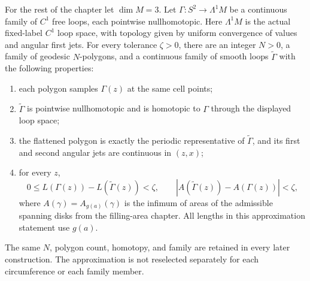 For the rest of the chapter let $\dim M=3$.
Let $\Gamma:S^2\to\Lambda^1M$ be a continuous family of $C^1$ free loops,
each pointwise nullhomotopic.  Here $\Lambda^1M$ is the actual fixed-label
$C^1$ loop space, with topology given by uniform convergence of values and
angular first jets.  For every tolerance $\zeta>0$, there are an integer
$N>0$, a family of geodesic $N$-polygons, and a continuous family of smooth loops
$\widetilde\Gamma$ with the following properties:
\begin{enumerate}
\item each polygon samples $\Gamma(z)$ at the same cell points;
\item $\widetilde\Gamma$ is pointwise nullhomotopic and is homotopic to
      $\Gamma$ through the displayed loop space;
\item the flattened polygon is exactly the periodic representative of
      $\widetilde\Gamma$, and its first and second angular jets are
      continuous in $(z,x)$;
\item for every $z$,
\[
 0\leq L(\Gamma(z))-L(\widetilde\Gamma(z))<\zeta,\qquad
 |A(\widetilde\Gamma(z))-A(\Gamma(z))|<\zeta,
\]
where $A(\gamma)=A_{g(a)}(\gamma)$ is the infimum of
areas of the admissible spanning disks from the filling-area chapter.
All lengths in this approximation statement use $g(a)$.
\end{enumerate}
The same $N$, polygon count, homotopy, and family are retained in every
later construction.  The approximation is not reselected separately for
each circumference or each family member.

